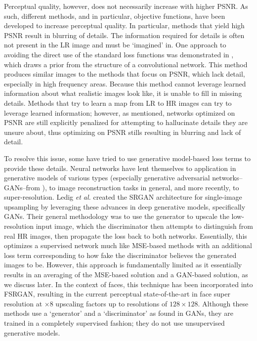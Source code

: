 \documentclass[10pt,twocolumn,letterpaper]{article}
\begin{document}
Perceptual quality, however, does not necessarily increase with higher PSNR. As such, different methods, and in particular, objective functions, have been developed to increase perceptual quality. In particular, methods that yield high PSNR result in blurring of details. The information required for details is often not present in the LR image and must be `imagined' in. One approach to avoiding the direct use of the standard loss functions was demonstrated in \cite{deep_prior}, which draws a prior from the structure of a convolutional network. This method produces similar images to the methods that focus on PSNR, which lack detail, especially in high frequency areas. Because this method cannot leverage learned information about what realistic images look like, it is unable to fill in missing details. Methods that try to learn a map from LR to HR images can try to leverage learned information; however, as mentioned, networks optimized on PSNR are still explicitly penalized for attempting to hallucinate details they are unsure about, thus optimizing on PSNR stills resulting in blurring and lack of detail. 


To resolve this issue, some have tried to use generative model-based loss terms to provide these details. Neural networks have lent themselves to application in generative models of various types (especially generative adversarial networks--GANs--from \cite{goodfellow2014generative}), to image reconstruction tasks in general, and more recently, to super-resolution. Ledig \textit{et al.} \cite{SRGAN} created the SRGAN architecture for single-image upsampling by leveraging these advances in deep generative models, specifically GANs. Their general methodology was to use the generator to upscale the low-resolution input image, which the discriminator then attempts to distinguish from real HR images, then propagate the loss back to both networks. Essentially, this optimizes a supervised network much like MSE-based methods with an additional loss term corresponding to how fake the discriminator believes the generated images to be. However, this approach is fundamentally limited as it essentially results in an averaging of the MSE-based solution and a GAN-based solution, as we discuss later. In the context of faces, this technique has been incorporated into FSRGAN, resulting in the current perceptual state-of-the-art in face super resolution at $\times 8$ upscaling factors up to resolutions of $128 \times 128$. Although these methods use a `generator' and a `discriminator' as found in GANs, they are trained in a completely supervised fashion; they do not use unsupervised generative models. 
\end{document}
